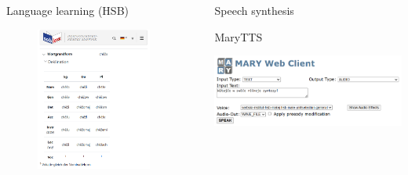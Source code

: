 \documentclass[final]{beamer}
\newlength{\sepwidth}
\newlength{\colwidth}
\newcommand{\separatorcolumn}{\begin{column}{\sepwidth}\end{column}}
\begin{document}
\begin{frame}[t]
\begin{columns}[t]
\begin{column}{\colwidth}
\begin{block}{Language learning (HSB)}
    \begin{figure}
        \centering
        \includegraphics[width=0.7\colwidth]{soblex_klein.png}
        \label{fig:soblex}
    \end{figure}

  \end{block}

\end{column}

\separatorcolumn

\begin{column}{\colwidth}

  \begin{block}{Speech synthesis}


    MaryTTS

    \includegraphics[width=\colwidth]{marytts_small.png}


\end{block}
\end{column}
\end{columns}
\end{frame}
\end{document}
